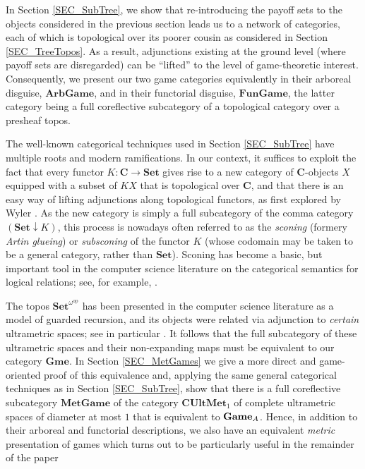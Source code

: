 \documentclass[12pt]{amsart}
\theoremstyle{definition}
\newcommand{\A}{\textup{\textmd{\textsc{A}}}}
\newcommand{\Sets}{\mathbf{Set}}
\newcommand{\CUMet}{\mathbf{CUltMet}_1}
\newcommand{\Games}{\mathbf{Game}}
\newcommand{\Gmes}{\mathbf{Gme}}
\newcommand{\SetNop}{\Sets^{\omega^{\op}}}
\newcommand{\op}{\mathrm{op}}
\begin{document}
In Section \ref{SEC_SubTree},	we show that re-introducing the payoff sets to the objects considered in the previous section leads us to a network of categories, each of which
is topological \cite{Adamek1990} over its poorer cousin as considered in Section  \ref{SEC_TreeTopos}. As a result, adjunctions existing at the ground level (where payoff sets are disregarded) can be ``lifted'' to the level of game-theoretic interest. Consequently, we present our two game categories equivalently in their arboreal disguise, $\mathbf{ArbGame}$, and in their functorial disguise, $\mathbf{FunGame}$, the latter category being a full coreflective subcategory of a topological category over a presheaf topos. 

The well-known categorical techniques used in Section \ref{SEC_SubTree} have multiple roots and modern ramifications. In our context, it suffices to exploit the fact that every functor $K:\mathbf C\to\Sets$ gives rise to a new category of $\mathbf C$-objects $X$ equipped with a subset of $KX$ that is topological over $\mathbf C$, and that there is an easy way of lifting adjunctions along topological functors, as first explored by Wyler \cite{Wyler1971a, Wyler1971b}. As the new category is simply a full subcategory of the comma category $(\Sets\downarrow K)$, this process is nowadays often referred to as the {\em sconing} (formery {\em Artin glueing}) or {\em subsconing} of the functor $K$ (whose codomain may be taken to be a general category, rather than $\Sets$). Sconing has become a basic, but important tool in the computer science literature on the categorical semantics for logical relations; see, for example, \cite{Goubault2008, Lucatelli2023}.

The topos $\SetNop$ has been presented in the computer science literature as a model of guarded recursion, and its objects were related via adjunction to {\em certain} ultrametric spaces; see in particular \cite{Birkedal2012}. It follows that the full subcategory of these ultrametric spaces and their non-expanding maps must be equivalent to our category $\Gmes$. In 
Section \ref{SEC_MetGames} we give a more direct and game-oriented proof of this equivalence and, applying the same general categorical techniques as in Section  \ref{SEC_SubTree}, show that there is a full coreflective subcategory $\mathbf{MetGame}$ of the category $\CUMet$ of complete ultrametric spaces of diameter at most $1$ that is equivalent to $\Games_\A$. Hence, in addition to their arboreal and functorial descriptions, we also have an equivalent {\em metric} presentation of games which turns out to be particularly useful in the remainder of the paper
\end{document}

